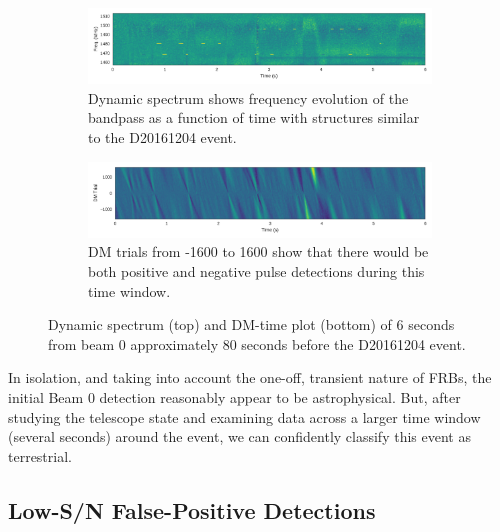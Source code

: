 \documentclass[a4paper,fleqn,usenatbib]{mnras}
\begin{document}
\begin{figure}
    \centering
    \begin{subfigure}[t]{1.0\textwidth}
        \centering\captionsetup{width=.95\linewidth}
        \includegraphics[width=1.0\textwidth]{figures/D20161204_spect_buf21_Beam0.pdf}
        \caption{Dynamic spectrum shows frequency evolution of the bandpass as a
        function of time with structures similar to the D20161204 event.
        }
        \label{fig:beam0_dynamic_spec_80s}
    \end{subfigure}
    \begin{subfigure}[t]{1.0\textwidth}
        \centering\captionsetup{width=.95\linewidth}
        \includegraphics[width=1.0\textwidth]{figures/D20161204_dmtrials_buf21_Beam0.pdf}
        \caption{DM trials from -1600 to 1600 show that there would be both
        positive and negative pulse detections during this time window.
        }
        \label{fig:beam0_dmtrials_80s}
    \end{subfigure}
    \caption{Dynamic spectrum (top) and DM-time plot (bottom) of 6 seconds from
    beam 0 approximately 80 seconds before the D20161204 event.
    }
    \label{fig:beamo0_80s}
\end{figure}

In isolation, and taking into account the one-off, transient nature of FRBs, the
initial Beam 0 detection reasonably appear to be astrophysical. But, after
studying the telescope state and examining data across a larger time window (several seconds) 
around the event, we can confidently classify this event as terrestrial.

\subsection{Low-S/N False-Positive Detections}
\label{sec:low_snr}
\end{document}
